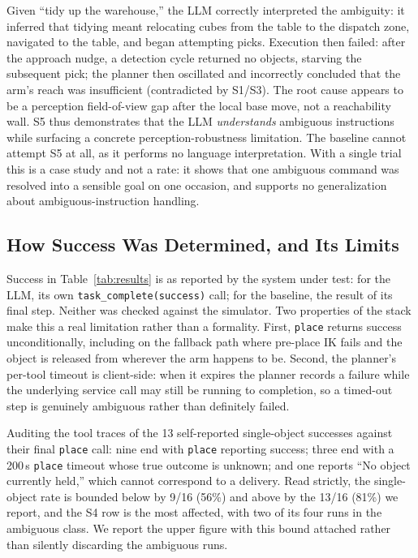 \documentclass[conference]{IEEEtran}
\begin{document}
Given ``tidy up the warehouse,'' the LLM correctly interpreted the
ambiguity: it inferred that tidying meant relocating cubes from the table
to the dispatch zone, navigated to the table, and began attempting picks.
Execution then failed: after the approach nudge, a detection cycle
returned no objects, starving the subsequent pick; the planner then
oscillated and incorrectly concluded that the arm's reach was insufficient
(contradicted by S1/S3). The root cause appears to be a perception
field-of-view gap after the local base move, not a reachability wall. S5
thus demonstrates that the LLM \emph{understands} ambiguous instructions
while surfacing a concrete perception-robustness limitation. The baseline
cannot attempt S5 at all, as it performs no language interpretation. With a
single trial this is a case study and not a rate: it shows that one
ambiguous command was resolved into a sensible goal on one occasion, and
supports no generalization about ambiguous-instruction handling.

\subsection{How Success Was Determined, and Its Limits}
\label{sec:verif}

Success in Table~\ref{tab:results} is as reported by the system under test:
for the LLM, its own \texttt{task\_complete(success)} call; for the
baseline, the result of its final step. Neither was checked against the
simulator. Two properties of the stack make this a real limitation rather
than a formality. First, \texttt{place} returns success unconditionally,
including on the fallback path where pre-place IK fails and the object is
released from wherever the arm happens to be. Second, the planner's
per-tool timeout is client-side: when it expires the planner records a
failure while the underlying service call may still be running to
completion, so a timed-out step is genuinely ambiguous rather than
definitely failed.

Auditing the tool traces of the 13 self-reported single-object successes
against their final \texttt{place} call: nine end with \texttt{place}
reporting success; three end with a 200\,s \texttt{place} timeout whose
true outcome is unknown; and one reports ``No object currently held,''
which cannot correspond to a delivery. Read strictly, the single-object
rate is bounded below by 9/16 (56\%) and above by the 13/16 (81\%) we
report, and the S4 row is the most affected, with two of its four runs in
the ambiguous class. We report the upper figure with this bound attached
rather than silently discarding the ambiguous runs.
\end{document}

